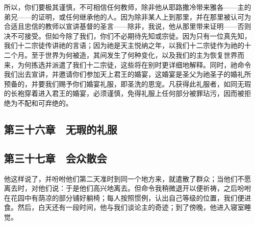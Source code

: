 所以，你们要极其谨慎，不可相信任何教师，除非他从耶路撒冷带来雅各——主的弟兄——的证明，或任何继承他的人。因为除非某人上到那里，并在那里被认可为合适且忠信的教师以宣讲基督的圣言——除非，我说，他从那里带来证明——否则决不可接受。但如今除了我们，你们不必期待先知或宗徒。因为只有一位真先知，我们十二宗徒传讲祂的言语；因为祂是天主悦纳之年，以我们十二宗徒作为祂的十二个月。至于世界为何被造，其间发生了何种变化，以及我们的主为恢复世界而来，为何拣选并派遣了我们十二宗徒，这些将在别时更详细地解释。同时，祂命令我们出去宣讲，并邀请你们参加天上君王的婚宴，这婚宴是圣父为祂圣子的婚礼所预备的，并要我们赐予你们婚宴礼服，即圣洗的恩宠。凡获得此礼服者，如同无瑕的长袍穿着进入君王的婚宴，必须谨慎，免得礼服上任何部分被罪玷污，因而被拒绝为不配和可弃绝的。\par


\subsection{第三十六章　无瑕的礼服}

\par


\subsection{第三十七章　会众散会}

他这样说了，并吩咐他们第二天准时到同一个地方来，就遣散了群众；当他们不愿离去时，对他们说：于是他们高兴地离去。但命令我稍微退开以便祈祷，之后吩咐在花园中有荫凉的部分铺好躺椅；每人按照惯例，认出自己等级的位置，我们便进食。然后，白天还有一段时间，他与我们谈论主的奇迹；到了傍晚，他进入寝室睡觉。\par

